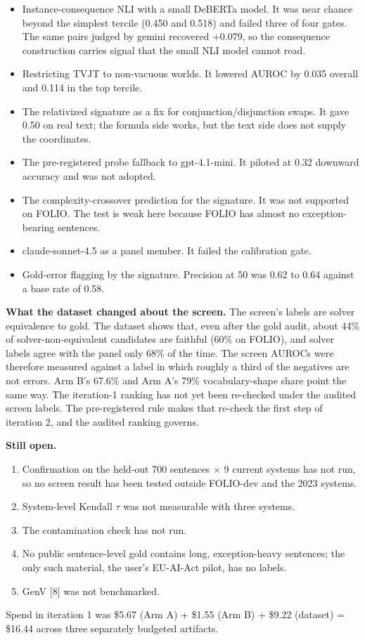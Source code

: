 \documentclass[11pt,letterpaper]{article}
\begin{document}
\begin{itemize}
\item {}Instance-consequence NLI with a small DeBERTa model. It was near chance beyond the simplest tercile (0.450 and 0.518) and failed three of four gates. The same pairs judged by gemini recovered +0.079, so the consequence construction carries signal that the small NLI model cannot read.
\item {}Restricting TVJT to non-vacuous worlds. It lowered AUROC by 0.035 overall and 0.114 in the top tercile.
\item {}The relativized signature as a fix for conjunction/disjunction swaps. It gave 0.50 on real text; the formula side works, but the text side does not supply the coordinates.
\item {}The pre-registered probe fallback to gpt-4.1-mini. It piloted at 0.32 downward accuracy and was not adopted.
\item {}The complexity-crossover prediction for the signature. It was not supported on FOLIO. The test is weak here because FOLIO has almost no exception-bearing sentences.
\item {}claude-sonnet-4.5 as a panel member. It failed the calibration gate.
\item {}Gold-error flagging by the signature. Precision at 50 was 0.62 to 0.64 against a base rate of 0.58.
\end{itemize}
\textbf{What the dataset changed about the screen.} The screen's labels are solver equivalence to gold. The dataset shows that, even after the gold audit, about 44\% of solver-non-equivalent candidates are faithful (60\% on FOLIO), and solver labels agree with the panel only 68\% of the time. The screen AUROCs were therefore measured against a label in which roughly a third of the negatives are not errors. Arm B's 67.6\% and Arm A's 79\% vocabulary-shape share point the same way. The iteration-1 ranking has not yet been re-checked under the audited screen labels. The pre-registered rule makes that re-check the first step of iteration 2, and the audited ranking governs.

\textbf{Still open.}

\begin{enumerate}
\item {}Confirmation on the held-out 700 sentences $\times$ 9 current systems has not run, so no screen result has been tested outside FOLIO-dev and the 2023 systems.
\item {}System-level Kendall $\tau$ was not measurable with three systems.
\item {}The contamination check has not run.
\item {}No public sentence-level gold contains long, exception-heavy sentences; the only such material, the user's EU-AI-Act pilot, has no labels.
\item {}GenV [8] was not benchmarked.
\end{enumerate}
Spend in iteration 1 was \$5.67 (Arm A) + \$1.55 (Arm B) + \$9.22 (dataset) = \$16.44 across three separately budgeted artifacts.
\end{document}
